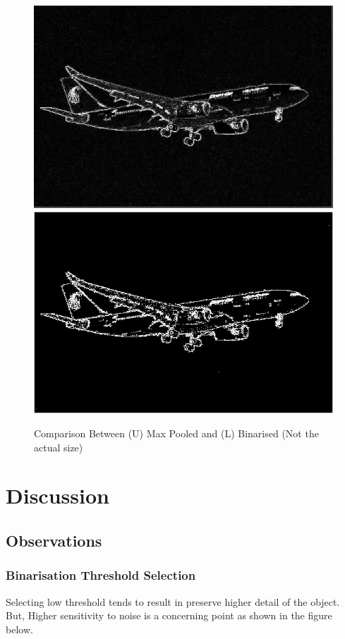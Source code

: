 \documentclass[12pt,a4paper]{report}
\begin{document}
\begin{figure}[!htb]
  \centering
  \includegraphics[width=0.9\linewidth]{result_img/aeroplane_Q3.png}
  \includegraphics[width=0.9\linewidth]{result_img/aeroplane_Q4.png}
  \caption{Comparison Between (U) Max Pooled and (L) Binarised (Not the actual size)}
\end{figure}
\clearpage

\chapter{Discussion}
\section{Observations}
\subsection{Binarisation Threshold Selection}
Selecting low threshold tends to result in preserve higher detail of the object. But, Higher sensitivity to noise is a concerning point as shown in the figure below.
\end{document}
